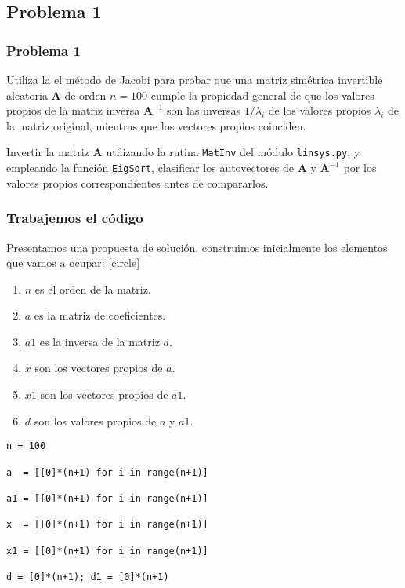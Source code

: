 \subsection{Problema 1}
\begin{frame}
\frametitle{Problema 1}
Utiliza la el método de Jacobi para probar que una matriz simétrica invertible aleatoria $\mathbf{A}$ de orden $n = 100$ cumple la propiedad general de que los valores propios de la matriz inversa $\mathbf{A}^{-1}$ son las inversas $1 / \lambda_{i}$ de los valores propios $\lambda_{i}$ de la matriz original, mientras que los vectores propios coinciden.
\end{frame}
\begin{frame}
Invertir la matriz $\mathbf{A}$ utilizando la rutina \texttt{MatInv} del módulo \texttt{linsys.py}, y empleando la función \texttt{EigSort}, clasificar los autovectores de $\mathbf{A}$ y $\mathbf{A}^{-1}$ por los valores propios correspondientes antes de compararlos.
\end{frame}
\begin{frame}
\frametitle{Trabajemos el código}
Presentamos una propuesta de solución, construimos inicialmente los elementos que vamos a ocupar:
[circle]
\begin{enumerate}[<+->]
\item $n$ es el orden de la matriz.
\item $a$ es la matriz de coeficientes.
\item $a1$ es la inversa de la matriz $a$.
\item $x$ son los vectores propios de $a$.
\item $x1$ son los vectores propios de $a1$.
\item $d$ son los valores propios de  $a$ y $a1$.
\end{enumerate}
\end{frame}
\begin{frame}[fragile]
\begin{lstlisting}[basicstyle=\linespread{0.9}\ttfamily\normalsize, columns=fullflexible]
n = 100

a  = [[0]*(n+1) for i in range(n+1)]

a1 = [[0]*(n+1) for i in range(n+1)]

x  = [[0]*(n+1) for i in range(n+1)]

x1 = [[0]*(n+1) for i in range(n+1)]

d = [0]*(n+1); d1 = [0]*(n+1)  
\end{lstlisting}
\end{frame}
